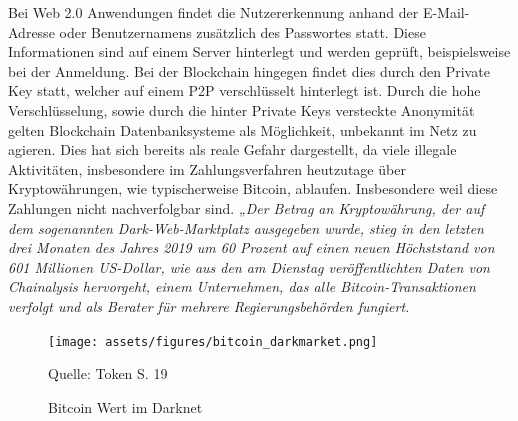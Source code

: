 Bei Web 2.0 Anwendungen findet die Nutzererkennung anhand der E-Mail-Adresse oder Benutzernamens zusätzlich des Passwortes statt.
Diese Informationen sind auf einem Server hinterlegt und werden geprüft, beispielsweise bei der Anmeldung.
Bei der Blockchain hingegen findet dies durch den Private Key statt, welcher auf einem P2P verschlüsselt hinterlegt ist.
Durch die hohe Verschlüsselung, sowie durch die hinter Private Keys versteckte Anonymität gelten Blockchain Datenbanksysteme als Möglichkeit, unbekannt im Netz zu agieren.
Dies hat sich bereits als reale Gefahr dargestellt, da viele illegale Aktivitäten, insbesondere im Zahlungsverfahren heutzutage über Kryptowährungen, wie typischerweise Bitcoin, ablaufen.
Insbesondere weil diese Zahlungen nicht nachverfolgbar sind.
\textit{„Der Betrag an Kryptowährung, der auf dem sogenannten Dark-Web-Marktplatz ausgegeben wurde, stieg in den letzten drei Monaten des Jahres 2019 um 60 Prozent auf einen neuen Höchststand von 601 Millionen US-Dollar, wie aus den am Dienstag veröffentlichten Daten von Chainalysis hervorgeht, einem Unternehmen, das alle Bitcoin-Transaktionen verfolgt und als Berater für mehrere Regierungsbehörden fungiert.} \cite{NewYorkTimes BlackMarket}

\begin{figure}[!ht]
    \caption{Bitcoin Wert im Darknet}
    \texttt{[image: assets/figures/bitcoin\_darkmarket.png]}
    \begin{flushleft}
        Quelle: Token S. 19
    \end{flushleft}
    \label{fig:birds3}
\end{figure}

